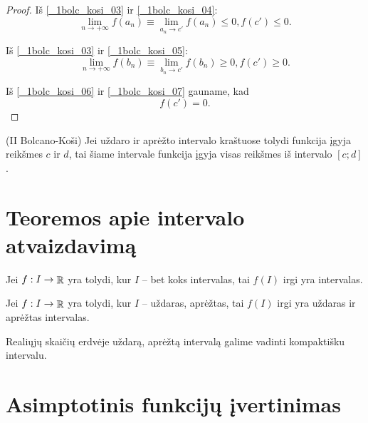 \begin{prop}
\begin{proof}
    Iš \ref{_1bolc_kosi_03} ir \ref{_1bolc_kosi_04}:
    \begin{equation}
      \lim_{n \to +\infty} f(a_{n}) 
        \equiv \lim_{a_{n} \to c'} f(a_{n}) \leq 0,
        f(c') \leq 0.
      \label{_1bolc_kosi_06}
    \end{equation}

    Iš \ref{_1bolc_kosi_03} ir \ref{_1bolc_kosi_05}:
    \begin{equation}
      \lim_{n \to +\infty} f(b_{n}) 
        \equiv \lim_{b_{n} \to c'} f(b_{n}) \geq 0,
        f(c') \geq 0.
      \label{_1bolc_kosi_07}
    \end{equation}

    Iš \ref{_1bolc_kosi_06} ir \ref{_1bolc_kosi_07} gauname, kad
    \begin{equation*}
      f(c') = 0.
    \end{equation*}
  \end{proof}
\end{prop}

\begin{prop}
  (II Bolcano-Koši) Jei uždaro ir aprėžto intervalo kraštuose tolydi
  funkcija įgyja reikšmes $c$ ir $d$, tai šiame intervale funkcija įgyja
  visas reikšmes iš intervalo $[c; d]$.
\end{prop}

\section{Teoremos apie intervalo atvaizdavimą}

\begin{prop}
  Jei $f : I \to \mathop{\mathbb{R}}$ yra tolydi, kur $I$ – bet koks intervalas, tai
  $f(I)$ irgi yra intervalas.
\end{prop}

\begin{prop}
  Jei $f : I \to \mathop{\mathbb{R}}$ yra tolydi, kur $I$ – uždaras, aprėžtas, tai 
  $f(I)$ irgi yra uždaras ir aprėžtas intervalas.
\end{prop}

\begin{note}
  Realiųjų skaičių erdvėje uždarą, aprėžtą intervalą galime vadinti
  kompaktišku intervalu.
\end{note}

\section{Asimptotinis funkcijų įvertinimas}


